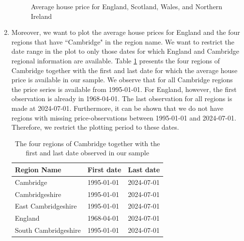 \documentclass[a4paper,11pt]{article}\usepackage[]{graphicx}\usepackage[]{xcolor}
\newenvironment{knitrout}{}{} %
\begin{document}
\begin{enumerate}
\begin{knitrout}
\begin{figure}[H]
{}

\caption[Average house price for England, Scotland, Wales, and Northern Ireland]{Average house price for England, Scotland, Wales, and Northern Ireland}\label{fig:plot_price_countries}
\end{figure}

\end{knitrout}






\item Moreover, we want to plot the average house prices for England and the four regions that have ``Cambridge" in the region name. We want to restrict the date range in the plot to only those dates for which England and Cambridge regional information are available. Table \ref{tab:table_cambridge} presents the four regions of Cambridge together with the first and last date for which the average house price is available in our sample. We observe that for all Cambridge regions the price series is available from 1995-01-01. For England, however, the first observation is already in 1968-04-01. The last observation for all regions is made at 2024-07-01. Furthermore, it can be shown that we do not have regions with missing price-observations between 1995-01-01 and 2024-07-01. Therefore, we restrict the plotting period to these dates. \par 

\begin{knitrout}
\color{fgcolor}\begin{table}[H] \captionsetup{margin = 105pt}
\centering
\caption{\label{tab:table_cambridge}The four regions of Cambridge together with the first and last date observed in our sample}
\centering
\begin{tabular}[t]{lll}
\toprule
Region Name & First date & Last date\\
\midrule
Cambridge & 1995-01-01 & 2024-07-01\\
Cambridgeshire & 1995-01-01 & 2024-07-01\\
East Cambridgeshire & 1995-01-01 & 2024-07-01\\
England & 1968-04-01 & 2024-07-01\\
South Cambridgeshire & 1995-01-01 & 2024-07-01\\
\bottomrule
\end{tabular}
\end{table} \captionsetup{margin = 105pt}

\end{knitrout}


\end{enumerate}
\end{document}
